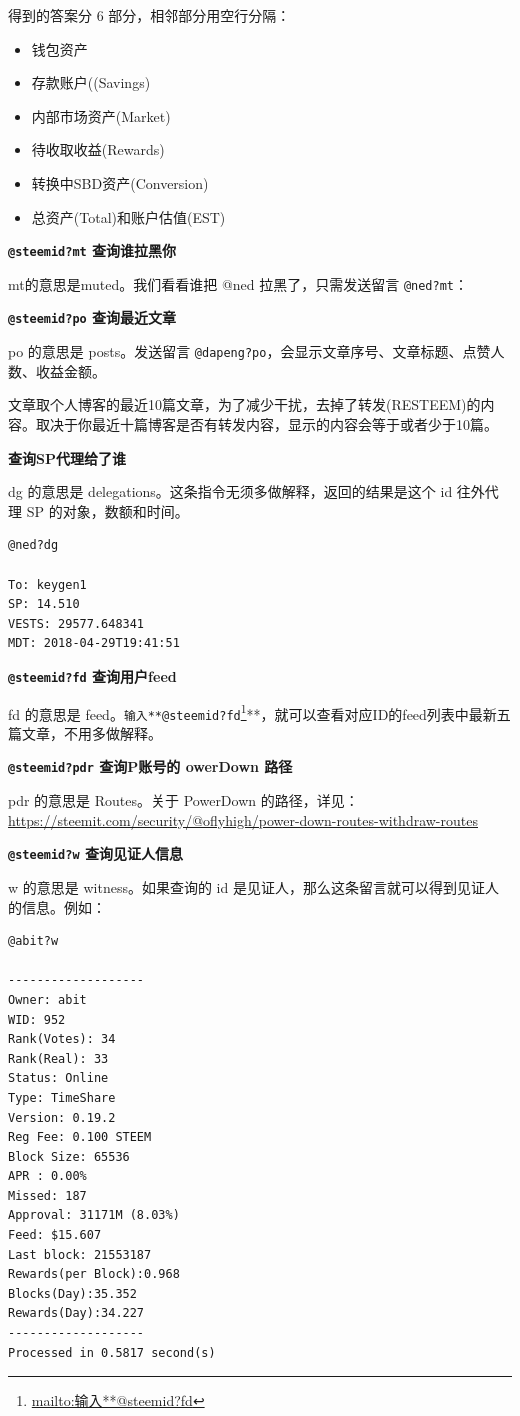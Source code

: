 \documentclass[]{ctexbook}
\renewcommand{\href}[2]{#2\footnote{\url{#1}}}
\begin{document}
得到的答案分 6 部分，相邻部分用空行分隔：

\begin{itemize}
\item
  钱包资产
\item
  存款账户((Savings)
\item
  内部市场资产(Market)
\item
  待收取收益(Rewards)
\item
  转换中SBD资产(Conversion)
\item
  总资产(Total)和账户估值(EST)
\end{itemize}

\textbf{\texttt{@steemid?mt} 查询谁拉黑你}

mt的意思是muted。我们看看谁把 @ned 拉黑了，只需发送留言 \texttt{@ned?mt}：

\textbf{\texttt{@steemid?po} 查询最近文章}

po 的意思是 posts。发送留言 \texttt{@dapeng?po}，会显示文章序号、文章标题、点赞人数、收益金额。

文章取个人博客的最近10篇文章，为了减少干扰，去掉了转发(RESTEEM)的内容。取决于你最近十篇博客是否有转发内容，显示的内容会等于或者少于10篇。

\textbf{\citet{steemid?dg} 查询SP代理给了谁}

dg 的意思是 delegations。这条指令无须多做解释，返回的结果是这个 id 往外代理 SP 的对象，数额和时间。

\begin{verbatim}
@ned?dg

To: keygen1
SP: 14.510
VESTS: 29577.648341
MDT: 2018-04-29T19:41:51
\end{verbatim}

\textbf{\texttt{@steemid?fd} 查询用户feed}

fd 的意思是 feed。\href{mailto:输入**@steemid?fd}{\nolinkurl{输入**@steemid?fd}}**，就可以查看对应ID的feed列表中最新五篇文章，不用多做解释。

\textbf{\texttt{@steemid?pdr} 查询P账号的 owerDown 路径}

pdr 的意思是 Routes。关于 PowerDown 的路径，详见：\url{https://steemit.com/security/@oflyhigh/power-down-routes-withdraw-routes}

\textbf{\texttt{@steemid?w} 查询见证人信息}

w 的意思是 witness。如果查询的 id 是见证人，那么这条留言就可以得到见证人的信息。例如：

\begin{verbatim}
@abit?w

-------------------
Owner: abit
WID: 952
Rank(Votes): 34
Rank(Real): 33
Status: Online
Type: TimeShare
Version: 0.19.2
Reg Fee: 0.100 STEEM
Block Size: 65536
APR : 0.00%
Missed: 187
Approval: 31171M (8.03%)
Feed: $15.607
Last block: 21553187
Rewards(per Block):0.968
Blocks(Day):35.352
Rewards(Day):34.227
-------------------
Processed in 0.5817 second(s)
\end{verbatim}
\end{document}
